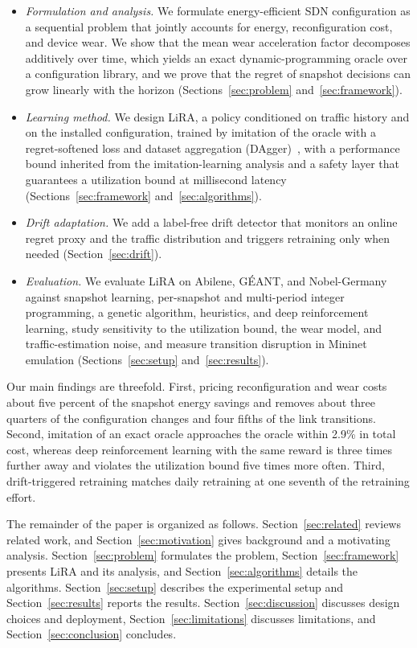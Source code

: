\documentclass[journal]{IEEEtran}
\begin{document}
\begin{itemize}
\item \emph{Formulation and analysis.} We formulate energy-efficient SDN configuration as a sequential problem that jointly accounts for energy, reconfiguration cost, and device wear. We show that the mean wear acceleration factor decomposes additively over time, which yields an exact dynamic-programming oracle over a configuration library, and we prove that the regret of snapshot decisions can grow linearly with the horizon (Sections~\ref{sec:problem} and~\ref{sec:framework}).
\item \emph{Learning method.} We design LiRA, a policy conditioned on traffic history and on the installed configuration, trained by imitation of the oracle with a regret-softened loss and dataset aggregation (DAgger)~\cite{ross2011dagger}, with a performance bound inherited from the imitation-learning analysis and a safety layer that guarantees a utilization bound at millisecond latency (Sections~\ref{sec:framework} and~\ref{sec:algorithms}).
\item \emph{Drift adaptation.} We add a label-free drift detector that monitors an online regret proxy and the traffic distribution and triggers retraining only when needed (Section~\ref{sec:drift}).
\item \emph{Evaluation.} We evaluate LiRA on Abilene, G\'{E}ANT, and Nobel-Germany against snapshot learning, per-snapshot and multi-period integer programming, a genetic algorithm, heuristics, and deep reinforcement learning, study sensitivity to the utilization bound, the wear model, and traffic-estimation noise, and measure transition disruption in Mininet emulation (Sections~\ref{sec:setup} and~\ref{sec:results}).
\end{itemize}

Our main findings are threefold. First, pricing reconfiguration and wear costs about five percent of the snapshot energy savings and removes about three quarters of the configuration changes and four fifths of the link transitions. Second, imitation of an exact oracle approaches the oracle within 2.9\% in total cost, whereas deep reinforcement learning with the same reward is three times further away and violates the utilization bound five times more often. Third, drift-triggered retraining matches daily retraining at one seventh of the retraining effort.

The remainder of the paper is organized as follows. Section~\ref{sec:related} reviews related work, and Section~\ref{sec:motivation} gives background and a motivating analysis. Section~\ref{sec:problem} formulates the problem, Section~\ref{sec:framework} presents LiRA and its analysis, and Section~\ref{sec:algorithms} details the algorithms. Section~\ref{sec:setup} describes the experimental setup and Section~\ref{sec:results} reports the results. Section~\ref{sec:discussion} discusses design choices and deployment, Section~\ref{sec:limitations} discusses limitations, and Section~\ref{sec:conclusion} concludes.
\end{document}
